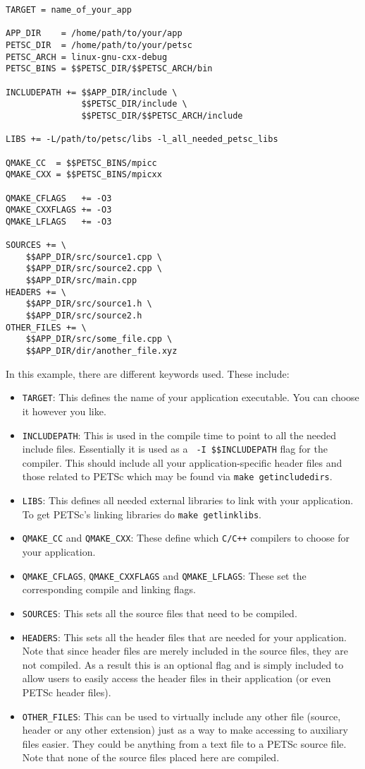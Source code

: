 {{\begin{lstlisting}
TARGET = name_of_your_app

APP_DIR    = /home/path/to/your/app
PETSC_DIR  = /home/path/to/your/petsc
PETSC_ARCH = linux-gnu-cxx-debug
PETSC_BINS = $$PETSC_DIR/$$PETSC_ARCH/bin

INCLUDEPATH += $$APP_DIR/include \
               $$PETSC_DIR/include \
               $$PETSC_DIR/$$PETSC_ARCH/include

LIBS += -L/path/to/petsc/libs -l_all_needed_petsc_libs

QMAKE_CC  = $$PETSC_BINS/mpicc
QMAKE_CXX = $$PETSC_BINS/mpicxx

QMAKE_CFLAGS   += -O3
QMAKE_CXXFLAGS += -O3
QMAKE_LFLAGS   += -O3

SOURCES += \
	$$APP_DIR/src/source1.cpp \
	$$APP_DIR/src/source2.cpp \
	$$APP_DIR/src/main.cpp
HEADERS += \
	$$APP_DIR/src/source1.h \
	$$APP_DIR/src/source2.h
OTHER_FILES += \
	$$APP_DIR/src/some_file.cpp \
	$$APP_DIR/dir/another_file.xyz

\end{lstlisting}

In this example, there are different keywords used. These include:
\begin{itemize}
\item \texttt{TARGET}: This defines the name of your application executable. You can choose it however you like.
\item \texttt{INCLUDEPATH}: This is used in the compile time to point to all the needed include files. Essentially it is used as a \texttt{ -I \$\$INCLUDEPATH} flag for the compiler. This should include all your application-specific header files and those related to PETSc which may be found via \texttt{make getincludedirs}.
\item \texttt{LIBS}: This defines all needed external libraries to link with your application. To get PETSc's linking libraries do \texttt{make getlinklibs}.
\item \texttt{QMAKE\_CC} and \texttt{QMAKE\_CXX}: These define which \texttt{C/C++} compilers to choose for your application.
\item \texttt{QMAKE\_CFLAGS}, \texttt{QMAKE\_CXXFLAGS} and \texttt{QMAKE\_LFLAGS}: These set the corresponding compile and linking flags.
\item \texttt{SOURCES}: This sets all the source files that need to be compiled.
\item \texttt{HEADERS}: This sets all the header files that are needed for your application. Note that since header files are merely included in the source files, they are not compiled. As a result this is an optional flag and is simply included to allow users to easily access the header files in their application (or even PETSc header files).
\item \texttt{OTHER\_FILES}: This can be used to virtually include any other file (source, header or any other extension) just as a way to make accessing to auxiliary files easier. They could be anything from a text file to a PETSc source file. Note that none of the source files placed here are compiled.
\end{itemize}

}}
